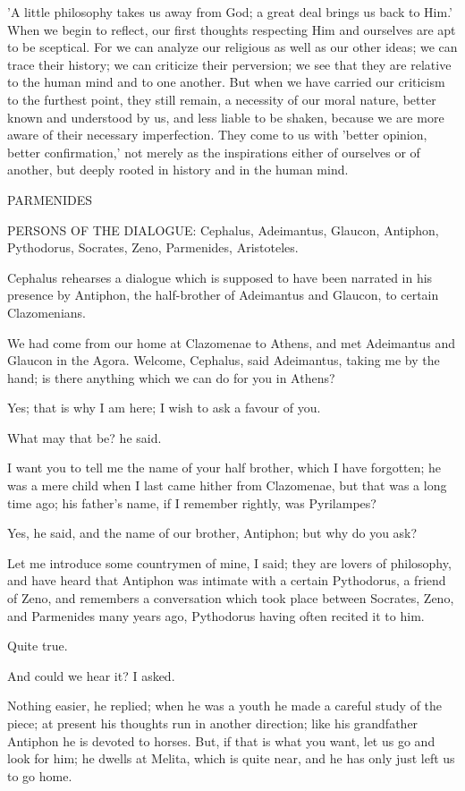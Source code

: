 'A little philosophy takes us away from God; a great deal brings us back
to Him.' When we begin to reflect, our first thoughts respecting Him and
ourselves are apt to be sceptical. For we can analyze our religious as
well as our other ideas; we can trace their history; we can criticize
their perversion; we see that they are relative to the human mind and
to one another. But when we have carried our criticism to the furthest
point, they still remain, a necessity of our moral nature, better known
and understood by us, and less liable to be shaken, because we are more
aware of their necessary imperfection. They come to us with 'better
opinion, better confirmation,' not merely as the inspirations either of
ourselves or of another, but deeply rooted in history and in the human
mind.




PARMENIDES


PERSONS OF THE DIALOGUE: Cephalus, Adeimantus, Glaucon, Antiphon,
Pythodorus, Socrates, Zeno, Parmenides, Aristoteles.

Cephalus rehearses a dialogue which is supposed to have been narrated in
his presence by Antiphon, the half-brother of Adeimantus and Glaucon, to
certain Clazomenians.


We had come from our home at Clazomenae to Athens, and met Adeimantus
and Glaucon in the Agora. Welcome, Cephalus, said Adeimantus, taking me
by the hand; is there anything which we can do for you in Athens?

Yes; that is why I am here; I wish to ask a favour of you.

What may that be? he said.

I want you to tell me the name of your half brother, which I have
forgotten; he was a mere child when I last came hither from Clazomenae,
but that was a long time ago; his father's name, if I remember rightly,
was Pyrilampes?

Yes, he said, and the name of our brother, Antiphon; but why do you ask?

Let me introduce some countrymen of mine, I said; they are lovers of
philosophy, and have heard that Antiphon was intimate with a certain
Pythodorus, a friend of Zeno, and remembers a conversation which took
place between Socrates, Zeno, and Parmenides many years ago, Pythodorus
having often recited it to him.

Quite true.

And could we hear it? I asked.

Nothing easier, he replied; when he was a youth he made a careful study
of the piece; at present his thoughts run in another direction; like his
grandfather Antiphon he is devoted to horses. But, if that is what you
want, let us go and look for him; he dwells at Melita, which is quite
near, and he has only just left us to go home.

